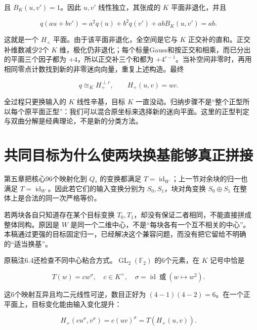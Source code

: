 \documentclass[UTF8,fontset=fandol,zihao=-4,openany,oneside]{ctexbook}
\begin{document}
且 \(B_K(u,v')=1\)。因此 \(u,v'\) 线性独立，其张成的 \(K\) 平面非退化，并且



\[
q(au+bv')=a^2q(u)+b^2q(v')+abB_K(u,v')=ab.
\]



这就是一个 \(H_+\) 平面。由于该平面非退化，全空间是它与 \(K\) 正交补的直和。正交补维数减少2个 \(K\) 维，极化仍非退化；每个标量Gauss和按正交和相乘，而已分出的平面三个因子都为 \(+4\)，所以正交补三个和都为 \(+4^{r-1}\)。当补空间非零时，再用相同零点计数找到新的非零迷向向量，重复上述构造。最终



\[
q\cong_K H_+^{\perp r},\qquad H_+(u,v)=uv.
\]



全过程只更换输入的 \(K\) 线性辛基，目标 \(K\) 一直没动。归纳步骤不是“整个正型所以每个原平面正型”：我们可以混合原坐标来选择新的迷向平面。这里的正型判定与双曲分解是经典理论，不是新的分类方法。



\section{共同目标为什么使两块换基能够真正拼接}


第五章把核心96个映射化到 \(Q_*\) 的变换都满足 \(T=\operatorname{id}_W\)；上一节对余块的归一也满足 \(T=\operatorname{id}_W\)。因此若它们的输入变换分别为 \(S_0,S_1\)，块对角变换 \(S_0\oplus S_1\) 在整体上是合法的同一次严格等价。



若两块各自只知道存在某个目标变换 \(T_0,T_1\)，却没有保证二者相同，不能直接拼成整体同构。原因是 \(W\) 是同一个二维中心，不是“每块各有一个互不相关的中心”。本稿通过更强的目标固定归一，已经解决这个兼容问题，而没有把它留给不明确的“适当换基”。



原稿注6.4还检查不同中心粘合方式。\(\operatorname{GL}_2(\mathbb F_2)\) 的6个元素，在 \(K\) 记号中恰是



\[
T(w)=c w^\sigma,
\quad c\in K^\times,
\quad \sigma=\operatorname{id}\ \text{或}\ (w\mapsto w^2).
\]



这6个映射互异且均二元线性可逆，数目正好为 \((4-1)(4-2)=6\)。在一个正平面上，目标变化能由输入变化提升：



\[
H_+(cu^\sigma,v^\sigma)=c(uv)^\sigma=T(H_+(u,v)).
\]
\end{document}

